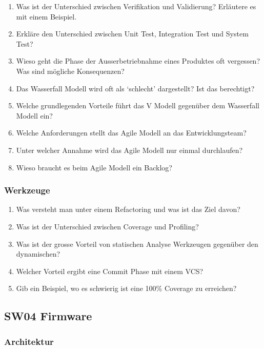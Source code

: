 \documentclass[
  10pt,
  a4paper,
]{article}
\numberwithin{equation}{section}
\begin{document}
\begin{enumerate}
\def\labelenumi{\arabic{enumi}.}
\item
  Was ist der Unterschied zwischen Verifikation und Validierung?
  Erläutere es mit einem Beispiel.
\item
  Erkläre den Unterschied zwischen Unit Test, Integration Test und
  System Test?
\item
  Wieso geht die Phase der Ausserbetriebnahme eines Produktes oft
  vergessen? Was sind mögliche Konsequenzen?
\item
  Das Wasserfall Modell wird oft als `schlecht' dargestellt? Ist das
  berechtigt?
\item
  Welche grundlegenden Vorteile führt das V Modell gegenüber dem
  Wasserfall Modell ein?
\item
  Welche Anforderungen stellt das Agile Modell an das Entwicklungsteam?
\item
  Unter welcher Annahme wird das Agile Modell nur einmal durchlaufen?
\item
  Wieso braucht es beim Agile Modell ein Backlog?
\end{enumerate}

\hypertarget{werkzeuge}{%
\subsubsection{Werkzeuge}\label{werkzeuge}}

\begin{enumerate}
\def\labelenumi{\arabic{enumi}.}
\item
  Was versteht man unter einem Refactoring und was ist das Ziel davon?
\item
  Was ist der Unterschied zwischen Coverage und Profiling?
\item
  Was ist der grosse Vorteil von statischen Analyse Werkzeugen gegenüber
  den dynamischen?
\item
  Welcher Vorteil ergibt eine Commit Phase mit einem VCS?
\item
  Gib ein Beispiel, wo es schwierig ist eine 100\% Coverage zu
  erreichen?
\end{enumerate}

\hypertarget{sw04-firmware}{%
\subsection{SW04 Firmware}\label{sw04-firmware}}

\hypertarget{architektur}{%
\subsubsection{Architektur}\label{architektur}}
\end{document}
